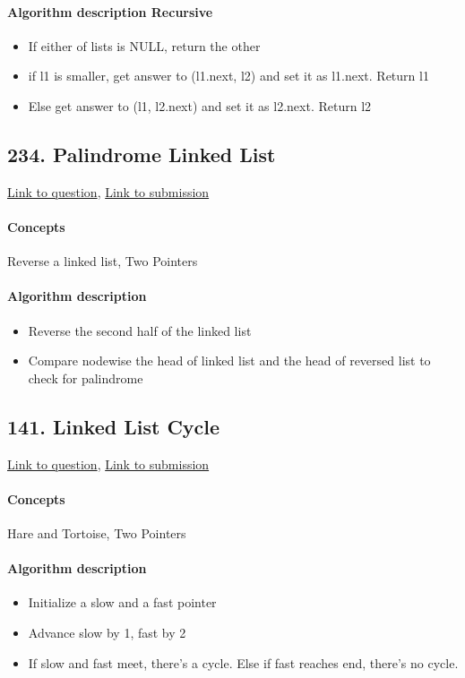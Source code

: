 \documentclass[11pt]{book}
\begin{document}
\paragraph{Algorithm description Recursive}
\begin{itemize}
    \item If either of lists is NULL, return the other
    \item if l1 is smaller, get answer to (l1.next, l2) and set it as l1.next. Return l1
    \item Else get answer to (l1, l2.next) and set it as l2.next. Return l2
\end{itemize}

\subsection{234. Palindrome Linked List}
\href{https://leetcode.com/problems/palindrome-linked-list/}{Link to question},
\href{https://leetcode.com/submissions/detail/334192848/}{Link to submission}
\paragraph{Concepts}
Reverse a linked list, Two Pointers
\paragraph{Algorithm description}
\begin{itemize}
    \item Reverse the second half of the linked list
    \item Compare nodewise the head of linked list and the head of reversed list
        to check for palindrome
\end{itemize}

\subsection{141. Linked List Cycle}
\href{https://leetcode.com/problems/linked-list-cycle/}{Link to question},
\href{https://leetcode.com/submissions/detail/334195990/}{Link to submission}
\paragraph{Concepts}
Hare and Tortoise, Two Pointers
\paragraph{Algorithm description}
\begin{itemize}
    \item Initialize a slow and a fast pointer
    \item Advance slow by 1, fast by 2
    \item If slow and fast meet, there's a cycle. Else if fast reaches end, there's no cycle.
\end{itemize}
\end{document}
